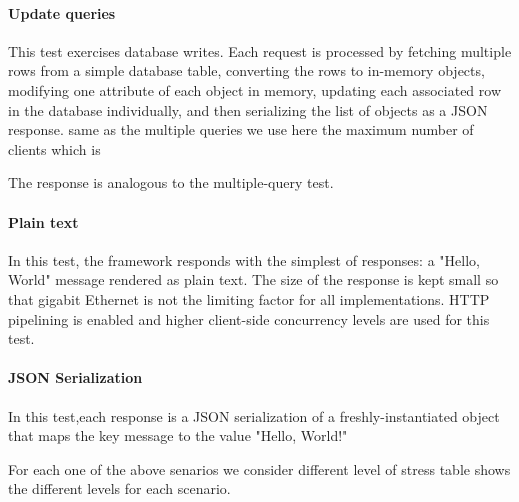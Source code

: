 \paragraph{Update queries}

This test exercises database writes. Each request is processed by fetching multiple rows from a simple database table, converting the rows to in-memory objects, modifying one attribute of each object in memory, updating each associated row in the database individually, and then serializing the list of objects as a JSON response.
same as the multiple queries  we use here  the maximum number of clients which is 

The response is analogous to the multiple-query test.

\paragraph{Plain text}
In this test, the framework responds with the simplest of responses: a "Hello, World" message rendered as plain text. The size of the response is kept small so that gigabit Ethernet is not the limiting factor for all implementations. HTTP pipelining is enabled and higher client-side concurrency levels are used for this test.

\paragraph{JSON Serialization}
In this test,each response is a JSON serialization of a freshly-instantiated object that maps the key message to the value "Hello, World!"

For each one of the above senarios we  consider different level of stress
table shows the different levels for each scenario.

